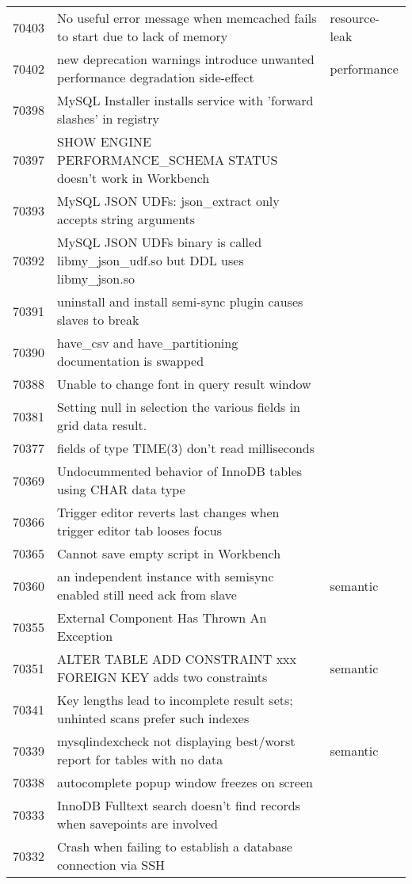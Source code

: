 \begin{longtable}[c]{p{1cm}p{8cm}p{3cm}}
70403 & No useful error message when memcached fails to start due to lack of memory & resource-leak \\
70402 & new deprecation warnings introduce unwanted performance degradation side-effect & performance \\
70398 & MySQL Installer installs service with 'forward slashes' in registry &  \\
70397 & SHOW ENGINE PERFORMANCE\_SCHEMA STATUS doesn't work in Workbench &  \\
70393 & MySQL JSON UDFs: json\_extract only accepts string arguments &  \\
70392 & MySQL JSON UDFs binary is called libmy\_json\_udf.so but DDL uses libmy\_json.so &  \\
70391 & uninstall and install semi-sync plugin causes slaves to break &  \\
70390 & have\_csv and have\_partitioning documentation is swapped &  \\
70388 & Unable to change font in query result window &  \\
70381 & Setting null in selection the various fields in grid data result. &  \\
70377 & fields of type TIME(3) don't read milliseconds &  \\
70369 & Undocummented behavior of InnoDB tables using CHAR data type &  \\
70366 & Trigger editor reverts last changes when trigger editor tab looses focus &  \\
70365 & Cannot save empty script in Workbench &  \\
70360 & an independent instance with semisync enabled still need ack from slave & semantic \\
70355 & External Component Has Thrown An Exception &  \\
70351 & ALTER TABLE ADD CONSTRAINT xxx FOREIGN KEY adds two constraints & semantic \\
70341 & Key lengths lead to incomplete result sets; unhinted scans prefer such indexes &  \\
70339 & mysqlindexcheck not displaying best/worst report for tables with no data & semantic \\
70338 & autocomplete popup window freezes on screen &  \\
70333 & InnoDB Fulltext search doesn't find records when savepoints are involved &  \\
70332 & Crash when failing to establish a database connection via SSH &  \\

\end{longtable}
